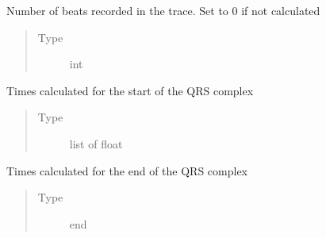 \documentclass[letterpaper,10pt,english]{sphinxmanual}
\begin{document}
\begin{fulllineitems}
\begin{fulllineitems}
\begin{quote}
\begin{description}
\end{description}\end{quote}

\end{fulllineitems}


\begin{fulllineitems}
\label{\detokenize{_autosummary/signalanalysis.general.Signal:signalanalysis.general.Signal.n_beats}}
\sphinxAtStartPar
Number of beats recorded in the trace. Set to 0 if not calculated
\begin{quote}\begin{description}
\item[{Type}] \leavevmode
\sphinxAtStartPar
int

\end{description}\end{quote}

\end{fulllineitems}


\begin{fulllineitems}
\label{\detokenize{_autosummary/signalanalysis.general.Signal:signalanalysis.general.Signal.qrs_start}}
\sphinxAtStartPar
Times calculated for the start of the QRS complex
\begin{quote}\begin{description}
\item[{Type}] \leavevmode
\sphinxAtStartPar
list of float

\end{description}\end{quote}

\end{fulllineitems}


\begin{fulllineitems}
\label{\detokenize{_autosummary/signalanalysis.general.Signal:signalanalysis.general.Signal.qrs_end}}
\sphinxAtStartPar
Times calculated for the end of the QRS complex
\begin{quote}\begin{description}
\item[{Type}] \leavevmode
\sphinxAtStartPar
end


\end{description}
\end{quote}
\end{fulllineitems}
\end{fulllineitems}
\end{document}
